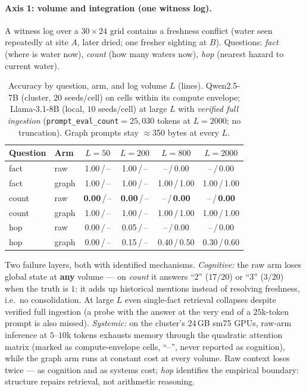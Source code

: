 \documentclass{article}
\begin{document}
\paragraph{Axis 1: volume and integration (one witness log).}
A witness log over a $30{\times}24$ grid contains a freshness conflict (water
seen repeatedly at site $A$, later dried; one fresher sighting at $B$).
Questions: \emph{fact} (where is water now), \emph{count} (how many waters
now), \emph{hop} (nearest hazard to current water).

\begin{table}[h]
\caption{Accuracy by question, arm, and log volume $L$ (lines). Qwen2.5-7B (cluster, $20$ seeds/cell) on cells within its compute envelope; Llama-3.1-8B (local, $10$ seeds/cell) at large $L$ with \emph{verified full ingestion} (\texttt{prompt\_eval\_count}${=}25{,}030$ tokens at $L{=}2000$; no truncation). Graph prompts stay $\approx$350 bytes at every $L$.}
\label{p4:tab:ctx-axis1}
\centering
\small
\begin{tabular}{l l c c c c}
\toprule
Question & Arm & $L{=}50$ & $L{=}200$ & $L{=}800$ & $L{=}2000$ \\
\midrule
fact  & raw   & 1.00\,/\,--   & 1.00\,/\,--   & --\,/\,0.00 & --\,/\,0.00 \\
fact  & graph & 1.00\,/\,--   & 1.00\,/\,--   & 1.00\,/\,1.00 & 1.00\,/\,1.00 \\
count & raw   & \textbf{0.00}\,/\,-- & \textbf{0.00}\,/\,-- & --\,/\,\textbf{0.00} & --\,/\,\textbf{0.00} \\
count & graph & 1.00\,/\,--   & 1.00\,/\,--   & 1.00\,/\,1.00 & 1.00\,/\,1.00 \\
hop   & raw   & 0.00\,/\,--   & 0.05\,/\,--   & --\,/\,0.00 & --\,/\,0.00 \\
hop   & graph & 0.00\,/\,--   & 0.15\,/\,--   & 0.40\,/\,0.50 & 0.30\,/\,0.60 \\
\bottomrule
\end{tabular}
\end{table}

Two failure layers, both with identified mechanisms. \emph{Cognitive:} the raw
arm loses global state at \textbf{any} volume --- on \emph{count} it answers
``2'' ($17/20$) or ``3'' ($3/20$) when the truth is $1$: it adds up historical
mentions instead of resolving freshness, i.e.\ no consolidation. At large $L$
even single-fact retrieval collapses despite verified full ingestion (a probe
with the answer at the very end of a $25$k-token prompt is also missed).
\emph{Systemic:} on the cluster's 24\,GB sm75 GPUs, raw-arm inference at
$5$--$10$k tokens exhausts memory through the quadratic attention matrix
(marked as compute-envelope cells, ``--'', never reported as cognition), while
the graph arm runs at constant cost at every volume. Raw context loses twice
--- as cognition and as systems cost; \emph{hop} identifies the empirical boundary:
structure repairs retrieval, not arithmetic reasoning.
\end{document}
